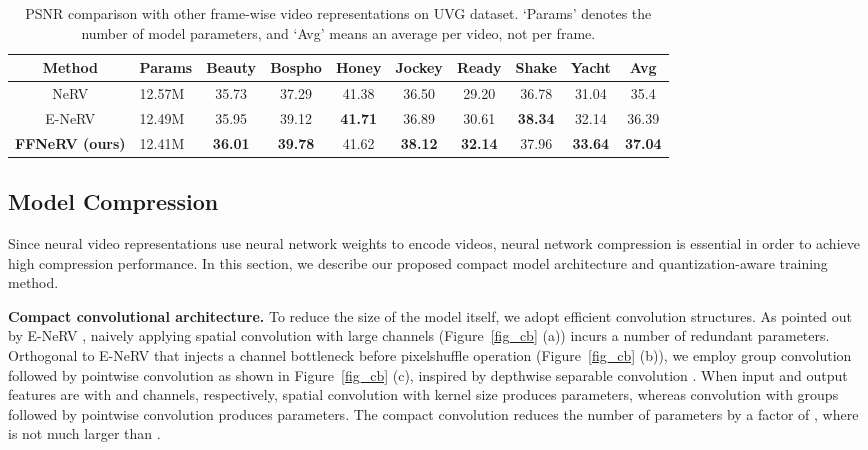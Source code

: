 \documentclass[sigconf]{acmart}
\begin{document}
\begin{table*}[t]
\caption{PSNR comparison with other frame-wise video representations on UVG dataset. `Params' denotes the number of model parameters, and `Avg' means an average per video, not per frame. }
\vskip 0.15in
\centering
\begin{tabular}{c|l||ccccccc||c}
\hline
 Method               & Params & Beauty & Bospho & Honey & Jockey & Ready & Shake & Yacht & Avg   \\ \hline\hline
NeRV   & 12.57M          & 35.73           & 37.29           & 41.38          & 36.50           & 29.20          & 36.78          & 31.04          & 35.4  \\ \hline
E-NeRV & 12.49M          & 35.95           & 39.12           & \textbf{41.71}          & 36.89           & 30.61          & \textbf{38.34}          & 32.14          & 36.39 \\ \hline
\textbf{FFNeRV (ours)}   & 12.41M          & \textbf{36.01}           & \textbf{39.78}           & 41.62          & \textbf{38.12}           & \textbf{32.14}          & 37.96          & \textbf{33.64}          & \textbf{37.04} \\ \hline
\end{tabular}
\label{tab_rep}
\end{table*}

\subsection{Model Compression}
Since neural video representations use neural network weights to encode videos, neural network compression is essential in order to achieve high compression performance.
In this section, we describe our proposed compact model architecture and quantization-aware training method.


\noindent\textbf{Compact convolutional architecture.}
To reduce the size of the model itself, we adopt efficient convolution structures.
As pointed out by E-NeRV \cite{enerv}, naively applying spatial convolution with large channels (Figure~\ref{fig_cb} (a)) incurs a number of redundant parameters.
Orthogonal to E-NeRV that injects a channel bottleneck before pixelshuffle operation (Figure~\ref{fig_cb} (b)), we employ group convolution followed by pointwise convolution as shown in Figure~\ref{fig_cb} (c), inspired by depthwise separable convolution \cite{mobilenet}.
When input and output features are with  and  channels, respectively, spatial convolution with kernel size  produces  parameters, whereas convolution with  groups followed by pointwise convolution produces  parameters.
The compact convolution reduces the number of parameters by a factor of , where  is not much larger than .
\end{document}
